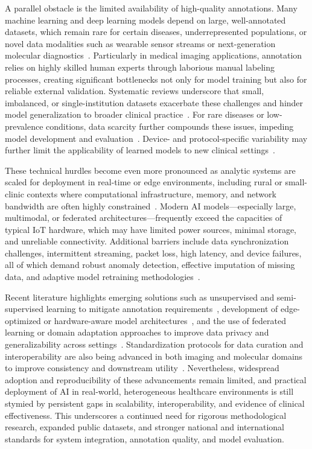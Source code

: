 \documentclass[sigconf]{acmart}
\begin{document}
A parallel obstacle is the limited availability of high-quality annotations. Many machine learning and deep learning models depend on large, well-annotated datasets, which remain rare for certain diseases, underrepresented populations, or novel data modalities such as wearable sensor streams or next-generation molecular diagnostics~\cite{ref54,ref53,ref55,ref65,ref66}. Particularly in medical imaging applications, annotation relies on highly skilled human experts through laborious manual labeling processes, creating significant bottlenecks not only for model training but also for reliable external validation. Systematic reviews underscore that small, imbalanced, or single-institution datasets exacerbate these challenges and hinder model generalization to broader clinical practice~\cite{ref50,ref54}. For rare diseases or low-prevalence conditions, data scarcity further compounds these issues, impeding model development and evaluation~\cite{ref53,ref58,ref59,ref60,ref61}. Device- and protocol-specific variability may further limit the applicability of learned models to new clinical settings~\cite{ref54,ref58,ref66,ref67}.

These technical hurdles become even more pronounced as analytic systems are scaled for deployment in real-time or edge environments, including rural or small-clinic contexts where computational infrastructure, memory, and network bandwidth are often highly constrained~\cite{ref16,ref37,ref46,ref54,ref57,ref61,ref70,ref71,ref72,ref73,ref74,ref75,ref76,ref78,ref83,ref90,ref106}. Modern AI models—especially large, multimodal, or federated architectures—frequently exceed the capacities of typical IoT hardware, which may have limited power sources, minimal storage, and unreliable connectivity. Additional barriers include data synchronization challenges, intermittent streaming, packet loss, high latency, and device failures, all of which demand robust anomaly detection, effective imputation of missing data, and adaptive model retraining methodologies~\cite{ref51,ref54,ref56,ref61,ref78,ref102}.

Recent literature highlights emerging solutions such as unsupervised and semi-supervised learning to mitigate annotation requirements~\cite{ref54,ref57,ref33,ref105}, development of edge-optimized or hardware-aware model architectures~\cite{ref54,ref78,ref102,ref103}, and the use of federated learning or domain adaptation approaches to improve data privacy and generalizability across settings~\cite{ref51,ref31,ref105}. Standardization protocols for data curation and interoperability are also being advanced in both imaging and molecular domains to improve consistency and downstream utility~\cite{ref45,ref60,ref84,ref82,ref83}. Nevertheless, widespread adoption and reproducibility of these advancements remain limited, and practical deployment of AI in real-world, heterogeneous healthcare environments is still stymied by persistent gaps in scalability, interoperability, and evidence of clinical effectiveness. This underscores a continued need for rigorous methodological research, expanded public datasets, and stronger national and international standards for system integration, annotation quality, and model evaluation.
\end{document}
